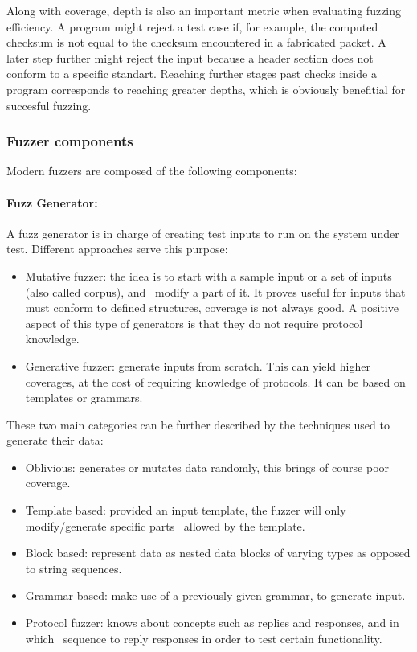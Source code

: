 Along with coverage, depth is also an important metric when evaluating fuzzing efficiency. A program
might reject a test case if, for example, the computed checksum is not equal to the checksum encountered
in a fabricated packet. A later step further might reject the input because a header section does not conform
to a specific standart. Reaching further stages past  checks inside a program corresponds to reaching greater
depths, which is obviously benefitial for succesful fuzzing.

\subsubsection{Fuzzer components}

Modern fuzzers are composed of the following components:

\paragraph{Fuzz Generator:}

A fuzz generator is in charge of creating test inputs to run on the system under test. Different
approaches serve this purpose\cite{mcnallyFuzzingStateArt2012}:

\begin{itemize}
    \item Mutative fuzzer: the idea is to start with a sample input or a set of inputs (also called corpus), and \
    modify a part of it. It proves useful for inputs that must conform to defined structures, coverage is not
    always good. A positive aspect of this type of generators is that they do not require protocol knowledge.
    \item Generative fuzzer: generate inputs from scratch. This can yield higher coverages, at the cost of requiring
    knowledge of protocols. It can be based on templates or grammars.
\end{itemize}

These two main categories can be further described by the techniques used to generate their data:

\begin{itemize}
    \item Oblivious: generates or mutates data randomly, this brings of course poor coverage.
    \item Template based: provided an input template, the fuzzer will only modify/generate specific parts \
    allowed by the template.
    \item Block based: represent data as nested data blocks of varying types as opposed to string sequences.
    \item Grammar based: make use of a previously given grammar, to generate input.
    \item Protocol fuzzer: knows about concepts such as replies and responses, and in which \
    sequence to reply responses in order to test certain functionality.
\end{itemize}

